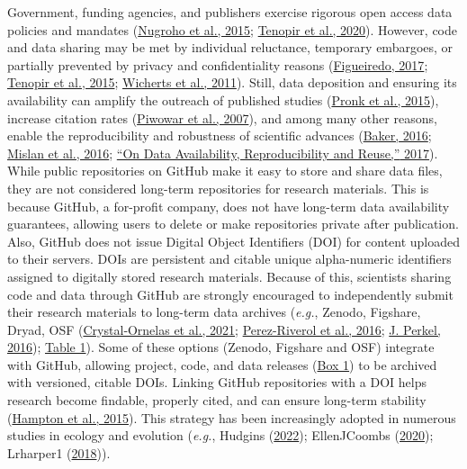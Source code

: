 Government, funding agencies, and publishers exercise rigorous open access data policies and mandates (\protect\hyperlink{ref-1Hcf13Q0k}{Nugroho et al., 2015}; \protect\hyperlink{ref-PLmDFZrm}{Tenopir et al., 2020}).
However, code and data sharing may be met by individual reluctance, temporary embargoes, or partially prevented by privacy and confidentiality reasons (\protect\hyperlink{ref-SLq38RVv}{Figueiredo, 2017}; \protect\hyperlink{ref-1CzUZwyU2}{Tenopir et al., 2015}; \protect\hyperlink{ref-1Ch6LSHef}{Wicherts et al., 2011}).
Still, data deposition and ensuring its availability can amplify the outreach of published studies (\protect\hyperlink{ref-666HppfO}{Pronk et al., 2015}), increase citation rates (\protect\hyperlink{ref-1CcAUn3Lu}{Piwowar et al., 2007}), and among many other reasons, enable the reproducibility and robustness of scientific advances (\protect\hyperlink{ref-1HZdsK5Kn}{Baker, 2016}; \protect\hyperlink{ref-uBJwnPbq}{Mislan et al., 2016}; \protect\hyperlink{ref-4LaijDIZ}{{``On Data Availability, Reproducibility and Reuse,''} 2017}).
While public repositories on GitHub make it easy to store and share data files, they are not considered long-term repositories for research materials.
This is because GitHub, a for-profit company, does not have long-term data availability guarantees, allowing users to delete or make repositories private after publication.
Also, GitHub does not issue Digital Object Identifiers (DOI) for content uploaded to their servers.
DOIs are persistent and citable unique alpha-numeric identifiers assigned to digitally stored research materials.
Because of this, scientists sharing code and data through GitHub are strongly encouraged to independently submit their research materials to long-term data archives (\emph{e.g.}, Zenodo, Figshare, Dryad, OSF (\protect\hyperlink{ref-1Du6fzB8g}{Crystal‐Ornelas et al., 2021}; \protect\hyperlink{ref-kEX5dgzK}{Perez-Riverol et al., 2016}; \protect\hyperlink{ref-10ghgV3S8}{J. Perkel, 2016}); \protect\hyperlink{tbl:compare}{Table 1}).
Some of these options (Zenodo, Figshare and OSF) integrate with GitHub, allowing project, code, and data releases (\protect\hyperlink{definitions}{Box 1}) to be archived with versioned, citable DOIs.
Linking GitHub repositories with a DOI helps research become findable, properly cited, and can ensure long-term stability (\protect\hyperlink{ref-iIEKCTLU}{Hampton et al., 2015}).
This strategy has been increasingly adopted in numerous studies in ecology and evolution (\emph{e.g.}, Hudgins (\protect\hyperlink{ref-GQj3c17f}{2022}); EllenJCoombs (\protect\hyperlink{ref-bZNn2hbh}{2020}); Lrharper1 (\protect\hyperlink{ref-ZI1OqZNr}{2018})).

